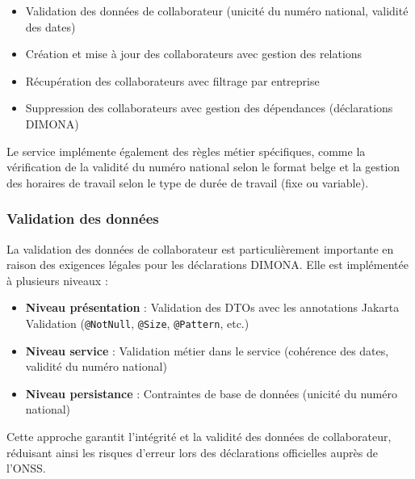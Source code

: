\vspace{0.5cm}

\begin{itemize}[leftmargin=*,label=\textcolor{darkgray}{$\bullet$},itemsep=0.3em]
  \item Validation des données de collaborateur (unicité du numéro national, validité des dates)
  \item Création et mise à jour des collaborateurs avec gestion des relations
  \item Récupération des collaborateurs avec filtrage par entreprise
  \item Suppression des collaborateurs avec gestion des dépendances (déclarations DIMONA)
\end{itemize}

\vspace{0.5cm}

Le service implémente également des règles métier spécifiques, comme la vérification de la validité du numéro national selon le format belge et la gestion des horaires de travail selon le type de durée de travail (fixe ou variable).

\subsubsection{Validation des données}

La validation des données de collaborateur est particulièrement importante en raison des exigences légales pour les déclarations DIMONA. Elle est implémentée à plusieurs niveaux :

\vspace{0.5cm}

\begin{tcolorbox}[
  title={\textbf{Approche multi-niveaux de validation}},
  colback=blue!5!white,
  colframe=primarycolor,
  fonttitle=\bfseries,
  boxrule=0.5mm,
  arc=2mm,
  left=6mm,
  right=6mm,
  top=6mm,
  bottom=6mm
]
\begin{itemize}[leftmargin=*,label=\textcolor{darkgray}{$\bullet$},itemsep=0.3em]
  \item \textbf{Niveau présentation} : Validation des DTOs avec les annotations Jakarta Validation (\texttt{@NotNull}, \texttt{@Size}, \texttt{@Pattern}, etc.)
  \item \textbf{Niveau service} : Validation métier dans le service (cohérence des dates, validité du numéro national)
  \item \textbf{Niveau persistance} : Contraintes de base de données (unicité du numéro national)
\end{itemize}

Cette approche garantit l'intégrité et la validité des données de collaborateur, réduisant ainsi les risques d'erreur lors des déclarations officielles auprès de l'ONSS.
\end{tcolorbox}

